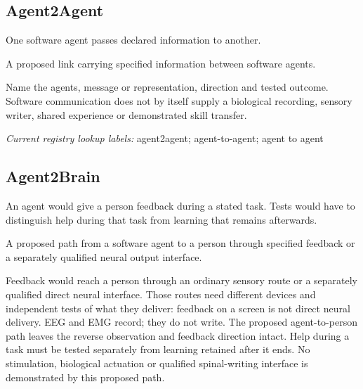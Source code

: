 \begin{samepage}
\subsection*{Agent2Agent}
\noindent One software agent passes declared information to another.\par
\end{samepage}
\noindent A proposed link carrying specified information between software agents.\par
\begin{samepage}
\noindent Name the agents, message or representation, direction and tested outcome. Software communication does not by itself supply a biological recording, sensory writer, shared experience or demonstrated skill transfer.\par\nopagebreak[4]

\end{samepage}


\noindent\textit{Current registry lookup labels:} agent2agent; agent-to-agent; agent to agent\par

\begin{samepage}
\subsection*{Agent2Brain}
\noindent An agent would give a person feedback during a stated task. Tests would have to distinguish help during that task from learning that remains afterwards.\par
\end{samepage}
\noindent A proposed path from a software agent to a person through specified feedback or a separately qualified neural output interface.\par
\begin{samepage}
\noindent Feedback would reach a person through an ordinary sensory route or a separately qualified direct neural interface. Those routes need different devices and independent tests of what they deliver: feedback on a screen is not direct neural delivery. EEG and EMG record; they do not write. The proposed agent-to-person path leaves the reverse observation and feedback direction intact. Help during a task must be tested separately from learning retained after it ends. No stimulation, biological actuation or qualified spinal-writing interface is demonstrated by this proposed path.\par\nopagebreak[4]

\end{samepage}


